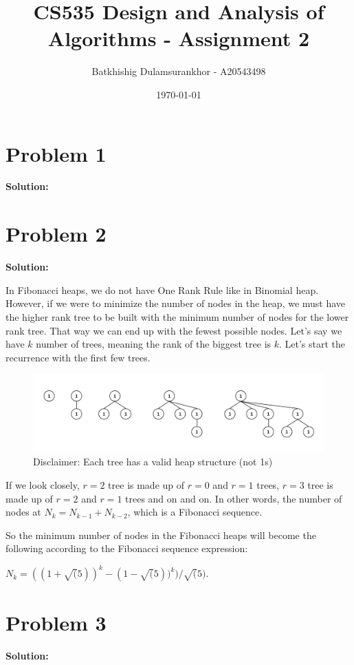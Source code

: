 \documentclass{article}
\title{CS535 Design and Analysis of Algorithms - Assignment 2}
\author{Batkhishig Dulamsurankhor - A20543498}
\date{\today} %
\begin{document}
\maketitle

\section*{Problem 1}
\textbf{Solution:}

\section*{Problem 2}
\textbf{Solution:}

In Fibonacci heaps, we do not have One Rank Rule like in Binomial heap. However, if we were to minimize the number of nodes in the
heap, we must have the higher rank tree to be built with the minimum number of nodes for the lower rank tree. That way we can end up with the fewest possible nodes.
Let's say we have $k$ number of trees, meaning the rank of the biggest tree is $k$. Let's start the recurrence with the first few trees.

\begin{figure}[h]
  \includegraphics[width=\textwidth]{image1.png}
  \caption{Disclaimer: Each tree has a valid heap structure (not 1s)}
  \centering
\end{figure}

If we look closely, $r=2$ tree is made up of $r=0$ and $r=1$ trees, $r=3$ tree is made up of $r=2$ and $r=1$ trees and on and on.
In other words, the number of nodes at $N_k=N_{k-1}+N_{k-2}$, which is a Fibonacci sequence.

So the minimum number of nodes in the Fibonacci heaps will become the following according to the Fibonacci sequence expression\cite{wiki}:

$N_k=((1+\sqrt(5))^k-(1-\sqrt(5))^k)/\sqrt(5).$

\section*{Problem 3}
\textbf{Solution:}
\end{document}
